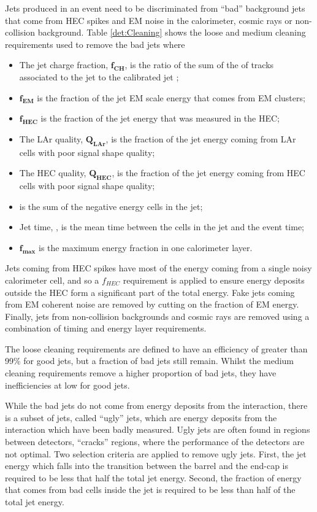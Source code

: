 Jets produced in an event need to be discriminated from ``bad'' background jets that come from  HEC spikes and EM noise in the calorimeter, cosmic rays or non-collision background.
Table \ref{det:Cleaning} shows the loose and medium cleaning requirements used to remove the bad jets where
\begin{itemize}
  \item The jet charge fraction, $\mathbf{f_{CH}}$, is the ratio of the sum of the \pt{} of tracks associated to the jet to the calibrated jet \pt{};
  \item  $\mathbf{f_{EM}}$ is the fraction of the jet EM scale energy that comes from EM clusters;
  \item  $\mathbf{f_{HEC}}$ is the fraction of the jet energy that was measured in the HEC;
  \item The LAr quality, $\mathbf{Q_{LAr}}$, is the fraction of the jet energy coming from LAr cells with poor signal shape quality;
  \item The HEC quality, $\mathbf{Q_{HEC}}$, is the fraction of the jet energy coming from HEC cells with poor signal shape quality;
  \item {} is the sum of the negative energy cells in the jet;
  \item Jet time, , is the mean time between the cells in the jet and the event time;
  \item $\mathbf{f_{max}}$ is the maximum energy fraction in one calorimeter layer.
\end{itemize}

Jets coming from HEC spikes have most of the energy coming from a single noisy calorimeter cell, and so a $f_{HEC}$ requirement is applied to ensure energy deposits outside the HEC form a significant part of the total energy.
Fake jets coming from EM coherent noise are removed by cutting on the fraction of EM energy.
Finally, jets from non-collision backgrounds and cosmic rays are removed using a combination of timing and energy layer requirements.

The loose cleaning requirements are defined to have an efficiency of greater than 99\% for good jets, but a fraction of bad jets still remain. 
Whilst the medium cleaning requirements remove a higher proportion of bad jets, they have inefficiencies at low \pt{} for good jets. 

While the bad jets do not come from energy deposits from the interaction, there is a subset of jets, called ``ugly'' jets, which are energy deposits from the interaction which have been badly measured. 
Ugly jets are often found in regions between detectors, ``cracks'' regions, where the performance of the detectors are not optimal.
Two selection criteria are applied to remove ugly jets.
First, the jet energy which falls into the transition between the barrel and the end-cap is required to be less that half the total jet energy.
Second, the fraction of energy that comes from bad cells inside the jet is required to be less than half of the total jet energy.


